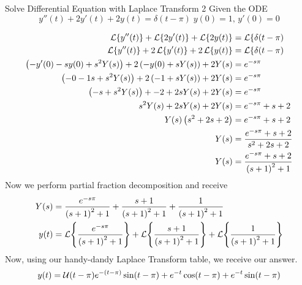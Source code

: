 \begin{example}[]{Solve Differential Equation with Laplace Transform 2}
  Given the ODE
  \begin{equation*}
    y''(t) + 2y'(t) + 2y(t) = \delta (t - \pi) \; y(0) = 1, \, y'(0) = 0
  \end{equation*}

  \tcblower

  \begin{align*}
    \operatorname{\mathcal{L}} \lbrace y''(t) \rbrace + \operatorname{\mathcal{L}} \lbrace 2y'(t) \rbrace + \operatorname{\mathcal{L}} \lbrace 2 y(t) \rbrace &= \operatorname{\mathcal{L}} \lbrace \delta (t - \pi) \\
    \operatorname{\mathcal{L}} \lbrace y''(t) \rbrace + 2 \operatorname{\mathcal{L}} \lbrace y'(t) \rbrace + 2 \operatorname{\mathcal{L}} \lbrace y(t) \rbrace &= \operatorname{\mathcal{L}} \lbrace \delta (t - \pi) \\
    \left( -y'(0) -sy(0) + s^{2}Y(s) \right) + 2 \left( -y(0) + sY(s) \right) + 2Y(s) &= e^{-s \pi} \\
    \left( -0 - 1s + s^{2}Y(s) \right) + 2 \left( -1 + sY(s) \right) + 2Y(s) &= e^{-s \pi} \\
    \left( -s + s^{2}Y(s) \right) + -2 + 2sY(s) + 2Y(s) &= e^{-s \pi} \\
    s^{2}Y(s) + 2sY(s) + 2Y(s) &= e^{-s \pi} + s + 2 \\
    Y(s) \left( s^{2} + 2s + 2 \right) &= e^{-s \pi} + s + 2 \\
    Y(s) &= \frac{e^{-s \pi} + s + 2}{s^{2} + 2s + 2} \\
    Y(s) &= \frac{e^{-s \pi} + s + 2}{{(s + 1)}^{2} + 1}
  \end{align*}
  Now we perform partial fraction decomposition and receive
  \begin{align*}
    Y(s) &= \frac{e^{-s \pi}}{{(s + 1)}^{2} + 1} + \frac{s+1}{{(s + 1)}^{2} + 1} + \frac{1}{{(s + 1)}^{2} + 1} \\
    y(t) &= \operatorname{\mathcal{L}} \Biggl\lbrace \frac{e^{-s \pi}}{{(s + 1)}^{2} + 1} \Biggr\rbrace + \operatorname{\mathcal{L}} \Biggl\lbrace \frac{s+1}{{(s + 1)}^{2} + 1} \Biggr\rbrace + \operatorname{\mathcal{L}} \Biggl\lbrace \frac{1}{{(s + 1)}^{2} + 1} \Biggr\rbrace
  \end{align*}
  Now, using our handy-dandy Laplace Transform table, we receive our answer.
  \begin{equation*}
    y(t) = \operatorname{\mathcal{U}}(t-\pi)e^{-(t-\pi)}\sin(t-\pi) + e^{-t}\cos(t-\pi) + e^{-t}\sin(t-\pi)
  \end{equation*}
\end{example}

